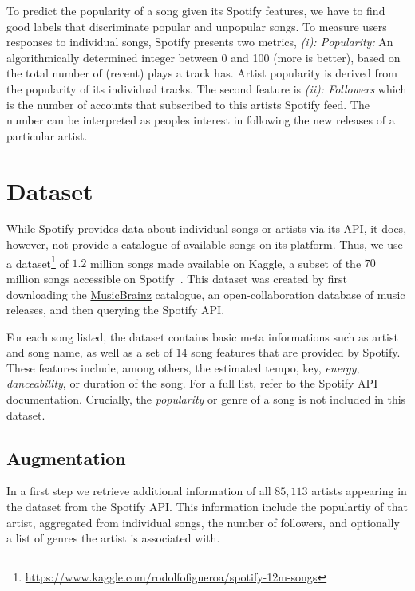 \documentclass{article}
\begin{document}
To predict the popularity of a song given its Spotify features, we have to find good labels that discriminate popular and unpopular songs.
To measure users responses to individual songs, Spotify presents two metrics, \textit{(i): Popularity:} An algorithmically determined integer between 0 and 100 (more is better), based on the total number of (recent) plays a track has. Artist popularity is derived from the popularity of its individual tracks. The second feature is \textit{(ii): Followers} which is the number of accounts that subscribed to this artists Spotify feed. The number can be interpreted as peoples interest in following the new releases of a particular artist.

\section{Dataset}
\label{sec:dataset}

While Spotify provides data about individual songs or artists via its API, it does, however, not provide a catalogue of available songs on its platform. Thus, we use a dataset\footnote{\url{https://www.kaggle.com/rodolfofigueroa/spotify-12m-songs}} of $1.2$ million songs made available on Kaggle, a subset of the $70$ million songs accessible on Spotify~\cite{ingham_2020}. This dataset was created by first downloading the \href{https://musicbrainz.org/}{MusicBrainz} catalogue, an open-collaboration database of music releases, and then querying the Spotify API. 

For each song listed, the dataset contains basic meta informations such as artist and song name, as well as a set of $14$ song features that are provided by Spotify. These features include, among others, the estimated tempo, key, \emph{energy}, \emph{danceability}, or duration of the song. For a full list, refer to the Spotify API documentation. Crucially, the \emph{popularity} or genre of a song is not included in this dataset.

\subsection{Augmentation}
In a first step we retrieve additional information of all $85,113$ artists appearing in the dataset from the Spotify API. This information include the populartiy of that artist, aggregated from individual songs, the number of followers, and optionally a list of genres the artist is associated with.
\end{document}
